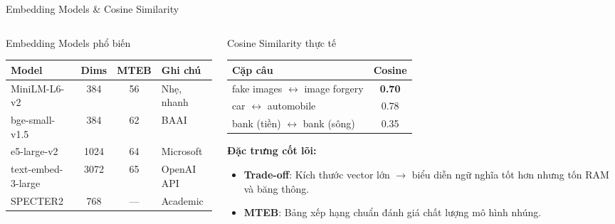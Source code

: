 \documentclass[aspectratio=169, 11pt]{beamer}
\begin{document}
\begin{frame}{Embedding Models \& Cosine Similarity}
\begin{columns}[T]
\begin{column}{0.50\textwidth}

\begin{block}{Embedding Models phổ biến}
\centering
\renewcommand{\arraystretch}{0.9}
{\small
\begin{tabular}{l c c l}
\toprule
\textbf{Model} & \textbf{Dims} & \textbf{MTEB} & \textbf{Ghi chú} \\
\midrule
MiniLM-L6-v2 & 384 & 56 & Nhẹ, nhanh \\
bge-small-v1.5 & 384 & 62 & BAAI \\
e5-large-v2 & 1024 & 64 & Microsoft \\
text-embed-3-large & 3072 & 65 & OpenAI API \\
SPECTER2 & 768 & --- & Academic \\
\bottomrule
\end{tabular}
}
\end{block}

\end{column}
\begin{column}{0.46\textwidth}

\begin{exampleblock}{Cosine Similarity thực tế}
\centering
\renewcommand{\arraystretch}{0.9}
{\small
\begin{tabular}{l c}
\toprule
\textbf{Cặp câu} & \textbf{Cosine} \\
\midrule
fake images $\leftrightarrow$ image forgery & \textcolor{accentTeal}{\textbf{0.70}} \\
car $\leftrightarrow$ automobile & \textcolor{accentTeal}{0.78} \\
bank (tiền) $\leftrightarrow$ bank (sông) & \textcolor{accentRed}{0.35} \\
\bottomrule
\end{tabular}
}
\end{exampleblock}

\vspace{0.15cm}
\textbf{Đặc trưng cốt lõi:}
\begin{itemize}
    \item {\small \textbf{Trade-off}: Kích thước vector lớn $\to$ biểu diễn ngữ nghĩa tốt hơn nhưng tốn RAM và băng thông.}
    \item {\small \textbf{MTEB}: Bảng xếp hạng chuẩn đánh giá chất lượng mô hình nhúng.}
\end{itemize}

\end{column}
\end{columns}
\end{frame}
\end{document}
